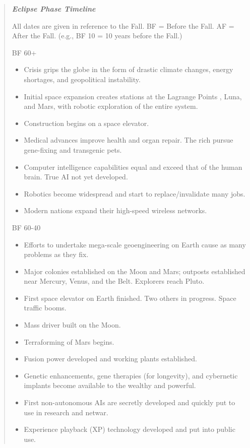 \begin{quote}

   \textbf{\emph{Eclipse Phase Timeline}}


   All dates are given in reference to the Fall. BF = Before the Fall.
   AF = After the Fall. (e.g., BF 10 = 10 years before the Fall.)


   BF 60+
   \begin{itemize}
      \item Crisis grips the globe in the form of drastic climate changes,
         energy shortages, and geopolitical instability.
      \item Initial space expansion creates stations at the Lagrange Points
         , Luna, and Mars, with robotic exploration of the entire system.
      \item Construction begins on a space elevator.
      \item Medical advances improve health and organ repair. The rich pursue
         gene-fixing and transgenic pets.
      \item Computer intelligence capabilities equal and exceed that of the
         human brain. True AI not yet developed.
      \item Robotics become widespread and start to replace/invalidate many jobs.
      \item Modern nations expand their high-speed wireless networks.
   \end{itemize}


   BF 60-40
   \begin{itemize}
      \item Efforts to undertake mega-scale geoengineering on Earth cause as
         many problems as they fix.
      \item Major colonies established on the Moon and Mars; outposts
         established near Mercury, Venus, and the Belt. Explorers reach Pluto.
      \item First space elevator on Earth finished. Two others in progress.
         Space traffic booms.
      \item Mass driver built on the Moon.
      \item Terraforming of Mars begins.
      \item Fusion power developed and working plants established.
      \item Genetic enhancements, gene therapies (for longevity), and
         cybernetic implants become available to the wealthy and powerful.
      \item First non-autonomous AIs are secretly developed and quickly put
         to use in research and netwar.
      \item Experience playback (XP) technology developed and put into public
         use.
   \end{itemize}



\end{quote}
